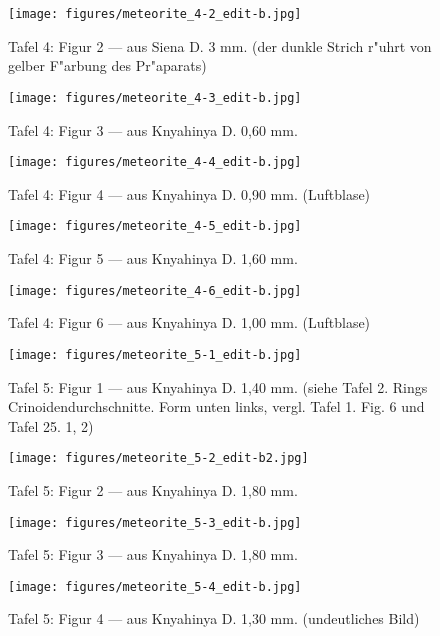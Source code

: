 \documentclass[a4paper, 11pt, oneside]{article}
\begin{document}
\clearpage
\begin{figure}[t]
\texttt{[image: figures/meteorite\_4-2\_edit-b.jpg]}
\caption{Tafel 4: Figur 2 --- aus Siena D. 3 mm. (der dunkle Strich r"uhrt von gelber F"arbung des Pr"aparats)}
\centering
\end{figure}
\clearpage
\begin{figure}[t]
\texttt{[image: figures/meteorite\_4-3\_edit-b.jpg]}
\caption{Tafel 4: Figur 3 --- aus Knyahinya D. 0,60 mm.}
\centering
\end{figure}
\clearpage
\begin{figure}[t]
\texttt{[image: figures/meteorite\_4-4\_edit-b.jpg]}
\caption{Tafel 4: Figur 4 --- aus Knyahinya D. 0,90 mm. (Luftblase)}
\centering
\end{figure}
\clearpage
\begin{figure}[t]
\texttt{[image: figures/meteorite\_4-5\_edit-b.jpg]}
\caption{Tafel 4: Figur 5 --- aus Knyahinya D. 1,60 mm.}
\centering
\end{figure}
\clearpage
\begin{figure}[t]
\texttt{[image: figures/meteorite\_4-6\_edit-b.jpg]}
\caption{Tafel 4: Figur 6 --- aus Knyahinya D. 1,00 mm. (Luftblase)}
\centering
\end{figure}
\clearpage
{}
\begin{figure}[t]
\texttt{[image: figures/meteorite\_5-1\_edit-b.jpg]}
\caption{Tafel 5: Figur 1 --- aus Knyahinya D. 1,40 mm. (siehe Tafel 2. Rings Crinoidendurchschnitte. Form unten links, vergl. Tafel 1. Fig. 6 und Tafel 25. 1, 2)}
\centering
\end{figure}
\clearpage
\begin{figure}[t]
\texttt{[image: figures/meteorite\_5-2\_edit-b2.jpg]}
\caption{Tafel 5: Figur 2 --- aus Knyahinya D. 1,80 mm.}
\centering
\end{figure}
\clearpage
\begin{figure}[t]
\texttt{[image: figures/meteorite\_5-3\_edit-b.jpg]}
\caption{Tafel 5: Figur 3 --- aus Knyahinya D. 1,80 mm.}
\centering
\end{figure}
\clearpage
\begin{figure}[t]
\texttt{[image: figures/meteorite\_5-4\_edit-b.jpg]}
\caption{Tafel 5: Figur 4 --- aus Knyahinya D. 1,30 mm. (undeutliches Bild)}
\centering
\end{figure}
\end{document}
